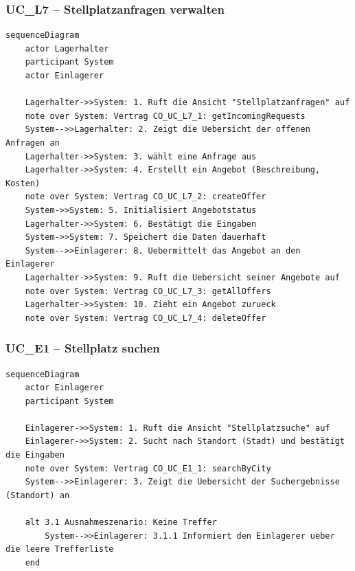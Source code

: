 \newpage

{}
\subsubsection*{UC\_L7 – Stellplatzanfragen verwalten}

\begin{lstlisting}[basicstyle=\ttfamily\small, breaklines=true]
sequenceDiagram
    actor Lagerhalter
    participant System
    actor Einlagerer

    Lagerhalter->>System: 1. Ruft die Ansicht "Stellplatzanfragen" auf
    note over System: Vertrag CO_UC_L7_1: getIncomingRequests
    System-->>Lagerhalter: 2. Zeigt die Uebersicht der offenen Anfragen an
    Lagerhalter->>System: 3. wählt eine Anfrage aus
    Lagerhalter->>System: 4. Erstellt ein Angebot (Beschreibung, Kosten)
    note over System: Vertrag CO_UC_L7_2: createOffer
    System->>System: 5. Initialisiert Angebotstatus
    Lagerhalter->>System: 6. Bestätigt die Eingaben
    System->>System: 7. Speichert die Daten dauerhaft
    System-->>Einlagerer: 8. Uebermittelt das Angebot an den Einlagerer
    Lagerhalter->>System: 9. Ruft die Uebersicht seiner Angebote auf
    note over System: Vertrag CO_UC_L7_3: getAllOffers
    Lagerhalter->>System: 10. Zieht ein Angebot zurueck
    note over System: Vertrag CO_UC_L7_4: deleteOffer
\end{lstlisting}

\newpage

{}
\subsubsection*{UC\_E1 – Stellplatz suchen}

\begin{lstlisting}[basicstyle=\ttfamily\small, breaklines=true]
sequenceDiagram
    actor Einlagerer
    participant System

    Einlagerer->>System: 1. Ruft die Ansicht "Stellplatzsuche" auf
    Einlagerer->>System: 2. Sucht nach Standort (Stadt) und bestätigt die Eingaben
    note over System: Vertrag CO_UC_E1_1: searchByCity
    System-->>Einlagerer: 3. Zeigt die Uebersicht der Suchergebnisse (Standort) an

    alt 3.1 Ausnahmeszenario: Keine Treffer
        System-->>Einlagerer: 3.1.1 Informiert den Einlagerer ueber die leere Trefferliste
    end
\end{lstlisting}

